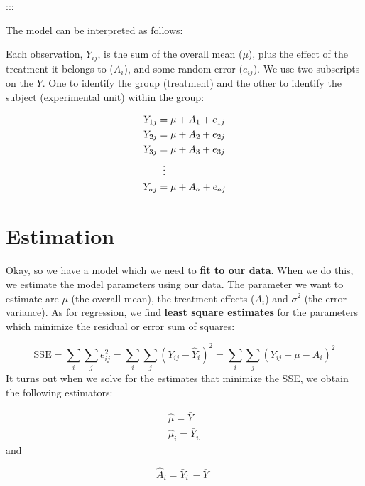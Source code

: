 \documentclass[
  letterpaper,
  DIV=11,
  numbers=noendperiod,
  oneside]{scrreprt}
\begin{document}
:::

The model can be interpreted as follows:

Each observation, \(Y_{ij}\), is the sum of the overall mean (\(\mu\)),
plus the effect of the treatment it belongs to (\(A_i\)), and some
random error (\(e_{ij}\)). We use two subscripts on the \(Y\). One to
identify the group (treatment) and the other to identify the subject
(experimental unit) within the group:

\begin{equation}
\begin{aligned}
Y_{1j} &= \mu + A_1 + e_{1j} \\ 
Y_{2j} &= \mu + A_2 + e_{2j} \\ 
Y_{3j} &= \mu + A_3 + e_{3j} \\

&\;\;\vdots \notag \\
Y_{aj} &= \mu +A_a + e_{aj} \\

\end{aligned}
\end{equation}

\section{Estimation}\label{estimation}

Okay, so we have a model which we need to \textbf{fit to our data}. When
we do this, we estimate the model parameters using our data. The
parameter we want to estimate are \(\mu\) (the overall mean), the
treatment effects (\(A_i\)) and \(\sigma^2\) (the error variance). As
for regression, we find \textbf{least square estimates} for the
parameters which minimize the residual or error sum of
squares:

\[ \text{SSE} = \sum_i\sum_je_{ij}^2 = \sum_i\sum_j (Y_{ij} - \hat{Y}_i)^2 = \sum_i\sum_j (Y_{ij} - \mu - A_i)^2\]
It turns out when we solve for the estimates that minimize the
SSE, we obtain the following estimators:

\[
\begin{aligned}
\hat{\mu} = \bar{Y}_{..} \\
\hat{\mu}_i = \bar{Y}_{i.}
\end{aligned}
\] and

\[\hat{A}_i =  \bar{Y}_{i.} - \bar{Y}_{..}\]
\end{document}
